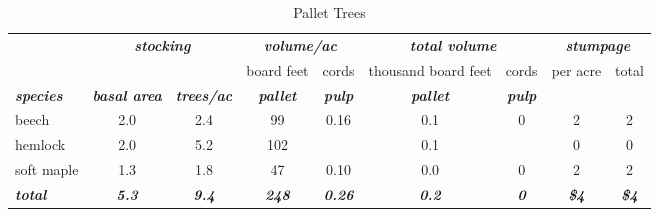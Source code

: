 \documentclass[landscape]{article}
\begin{document}
\begin{table}[H]

\caption{\label{tab:unnamed-chunk-34}Pallet Trees}
\fontsize{10}{12}\selectfont
\begin{tabular}[t]{lcccccccc}
\toprule
\multicolumn{1}{c}{\em{\textbf{ }}} & \multicolumn{2}{c}{\em{\textbf{stocking}}} & \multicolumn{2}{c}{\em{\textbf{volume/ac }}} & \multicolumn{2}{c}{\em{\textbf{total volume}}} & \multicolumn{2}{c}{\em{\textbf{stumpage}}} \\
\cmidrule(l{3pt}r{3pt}){2-3} \cmidrule(l{3pt}r{3pt}){4-5} \cmidrule(l{3pt}r{3pt}){6-7} \cmidrule(l{3pt}r{3pt}){8-9}
\multicolumn{3}{c}{ } & \multicolumn{1}{c}{board feet} & \multicolumn{1}{c}{cords} & \multicolumn{1}{c}{thousand board feet} & \multicolumn{1}{c}{cords} & \multicolumn{1}{c}{per acre} & \multicolumn{1}{c}{total} \\
\cmidrule(l{3pt}r{3pt}){4-4} \cmidrule(l{3pt}r{3pt}){5-5} \cmidrule(l{3pt}r{3pt}){6-6} \cmidrule(l{3pt}r{3pt}){7-7} \cmidrule(l{3pt}r{3pt}){8-8} \cmidrule(l{3pt}r{3pt}){9-9}
\rowcolor[HTML]{DCDCDC}  \em{\textbf{species}} & \em{\textbf{basal area}} & \em{\textbf{trees/ac}} & \em{\textbf{pallet}} & \em{\textbf{pulp}} & \em{\textbf{pallet}} & \em{\textbf{pulp}} & \em{\textbf{ }} & \em{\textbf{ }}\\
\midrule
\rowcolor{gray!6}  beech & 2.0 & 2.4 & 99 & 0.16 & 0.1 & 0 & 2 & 2\\
 
hemlock & 2.0 & 5.2 & 102 &  & 0.1 &  & 0 & 0\\
 
\rowcolor{gray!6}  soft maple & 1.3 & 1.8 & 47 & 0.10 & 0.0 & 0 & 2 & 2\\
 
\rowcolor[HTML]{DCDCDC}  \em{\textbf{total}} & \em{\textbf{5.3}} & \em{\textbf{9.4}} & \em{\textbf{248}} & \em{\textbf{0.26}} & \em{\textbf{0.2}} & \em{\textbf{0}} & \em{\textbf{\$4}} & \em{\textbf{\$4}}\\
\bottomrule
\end{tabular}
\end{table}
\end{document}
